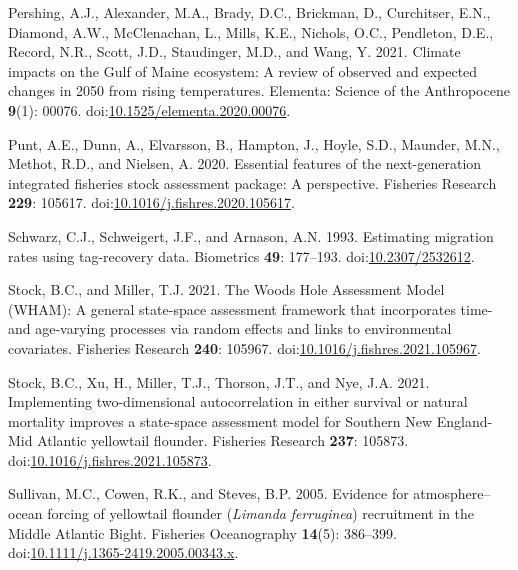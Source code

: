 \documentclass[
]{article}
\newlength{\cslhangindent}
\newlength{\cslentryspacingunit} %
\newenvironment{CSLReferences}[2] %
 {%
  \setlength{\parindent}{0pt}
  \ifodd #1
  \let\oldpar\par
  \def\par{\hangindent=\cslhangindent\oldpar}
  \fi
  \setlength{\parskip}{#2\cslentryspacingunit}
 }%
 {}
\begin{document}
\begin{CSLReferences}{1}{0}
\leavevmode{}%
Pershing, A.J., Alexander, M.A., Brady, D.C., Brickman, D., Curchitser, E.N., Diamond, A.W., McClenachan, L., Mills, K.E., Nichols, O.C., Pendleton, D.E., Record, N.R., Scott, J.D., Staudinger, M.D., and Wang, Y. 2021. Climate impacts on the {G}ulf of {M}aine ecosystem: A review of observed and expected changes in 2050 from rising temperatures. Elementa: Science of the Anthropocene \textbf{9}(1): 00076. doi:\href{https://doi.org/10.1525/elementa.2020.00076}{10.1525/elementa.2020.00076}.

\leavevmode{}%
Punt, A.E., Dunn, A., Elvarsson, B., Hampton, J., Hoyle, S.D., Maunder, M.N., Methot, R.D., and Nielsen, A. 2020. Essential features of the next-generation integrated fisheries stock assessment package: A perspective. Fisheries Research \textbf{229}: 105617. doi:\href{https://doi.org/10.1016/j.fishres.2020.105617}{10.1016/j.fishres.2020.105617}.

\leavevmode{}%
Schwarz, C.J., Schweigert, J.F., and Arnason, A.N. 1993. Estimating migration rates using tag-recovery data. Biometrics \textbf{49}: 177--193. doi:\href{https://doi.org/10.2307/2532612}{10.2307/2532612}.

\leavevmode{}%
Stock, B.C., and Miller, T.J. 2021. The {Woods Hole Assessment Model} ({WHAM}): A general state-space assessment framework that incorporates time- and age-varying processes via random effects and links to environmental covariates. Fisheries Research \textbf{240}: 105967. doi:\href{https://doi.org/10.1016/j.fishres.2021.105967}{10.1016/j.fishres.2021.105967}.

\leavevmode{}%
Stock, B.C., Xu, H., Miller, T.J., Thorson, J.T., and Nye, J.A. 2021. Implementing two-dimensional autocorrelation in either survival or natural mortality improves a state-space assessment model for {Southern New England}-{Mid Atlantic} yellowtail flounder. Fisheries Research \textbf{237}: 105873. doi:\href{https://doi.org/10.1016/j.fishres.2021.105873}{10.1016/j.fishres.2021.105873}.

\leavevmode{}%
Sullivan, M.C., Cowen, R.K., and Steves, B.P. 2005. Evidence for atmosphere{--}ocean forcing of yellowtail flounder (\emph{{L}imanda} \emph{ferruginea}) recruitment in the {M}iddle {A}tlantic {B}ight. Fisheries Oceanography \textbf{14}(5): 386--399. doi:\href{https://doi.org/10.1111/j.1365-2419.2005.00343.x}{10.1111/j.1365-2419.2005.00343.x}.


\end{CSLReferences}
\end{document}
